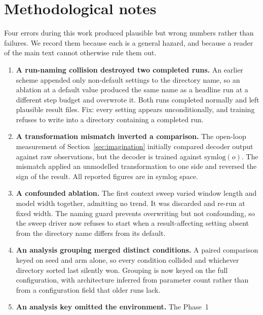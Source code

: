 \documentclass[11pt,onecolumn]{article}
\begin{document}
\section{Methodological notes}\label{app:notes}
Four errors during this work produced plausible but wrong numbers rather
than failures. We record them because each is a general hazard, and
because a reader of the main text cannot otherwise rule them out.

\begin{enumerate}\itemsep3pt
\item \textbf{A run-naming collision destroyed two completed runs.} An
      earlier scheme appended only non-default settings to the directory
      name, so an ablation at a default value produced the same name as
      a headline run at a different step budget and overwrote it. Both
      runs completed normally and left plausible result files. Fix: every
      setting appears unconditionally, and training refuses to write
      into a directory containing a completed run.
\item \textbf{A transformation mismatch inverted a comparison.} The
      open-loop measurement of Section~\ref{sec:imagination} initially
      compared decoder output against raw observations, but the decoder
      is trained against $\mathrm{symlog}(o)$. The mismatch applied an
      unmodelled transformation to one side and reversed the sign of the
      result. All reported figures are in symlog space.
\item \textbf{A confounded ablation.} The first context sweep varied
      window length and model width together, admitting no trend. It was
      discarded and re-run at fixed width. The naming guard prevents
      overwriting but not confounding, so the sweep driver now refuses
      to start when a result-affecting setting absent from the directory
      name differs from its default.
\item \textbf{An analysis grouping merged distinct conditions.} A paired
      comparison keyed on seed and arm alone, so every condition
      collided and whichever directory sorted last silently won.
      Grouping is now keyed on the full configuration, with architecture
      inferred from parameter count rather than from a configuration
      field that older runs lack.
\item \textbf{An analysis key omitted the environment.} The Phase~1

\end{enumerate}
\end{document}

